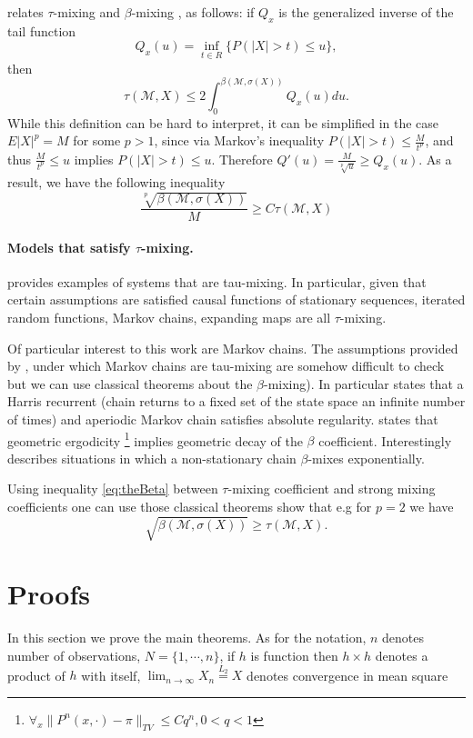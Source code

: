 \documentclass{article} %
\begin{document}
 
\cite[Equation  7.6]{dedecker2005new} relates $\tau$-mixing and $\beta$-mixing , as follows: if $Q_x$ is the generalized inverse of the tail function
\[
 Q_x(u) = \inf_{t \in R} \{  P(|X| > t) \leq u\},  
\]
then
\[
 \tau(\mathcal{M},X) \leq 2 \int_{0}^{\beta(\mathcal{M},\sigma(X))}  Q_x(u) du.
\]
While this definition can be hard to interpret, it can be simplified in the case $E|X|^p=M$  for some $p>1$, since via Markov's inequality $P(|X|>t) \leq \frac{M}{t^p}$, and thus $\frac{M}{t^p} \leq u $ implies $P(|X|>t) \leq u$. Therefore $Q'(u) = \frac{M}{\sqrt[p]{u}} \geq Q_x(u)$. As a result, we have the following inequality 
\begin{equation}
\label{eq:theBeta}
 \frac{ \sqrt[p]{ \beta(\mathcal{M},\sigma(X))} }{ M }  \geq C  \tau(\mathcal{M},X) 
\end{equation}

\paragraph{Models that satisfy $\tau$-mixing.}
\cite{dedecker2005new} provides  examples of systems that are tau-mixing. In particular, given that certain assumptions are satisfied  causal functions of stationary sequences, iterated random functions, Markov chains, expanding maps are all $\tau$-mixing. 

Of particular interest to this work are Markov chains. The assumptions provided by \cite{dedecker2005new}, under which Markov chains are tau-mixing are somehow difficult to check but we can use classical theorems about the $\beta$-mixing).  In particular \cite[Corollary 3.6]{bradley_basic_2005}  states that a Harris recurrent (chain returns to a fixed set of the state space an infinite number of times) and aperiodic Markov chain satisfies absolute regularity.  \cite[Theorem 3.7]{bradley_basic_2005} states that geometric ergodicity \footnote{ $\forall_{x} \|P^n(x,\cdot)  -\pi \|_{TV} \leq C q^n, 0<q<1$} implies geometric decay of the $\beta$ coefficient. Interestingly \cite[Theorem 3.3]{bradley_basic_2005} describes situations in which a non-stationary chain $\beta$-mixes exponentially. 

Using inequality \ref{eq:theBeta} between $\tau$-mixing coefficient and strong mixing coefficients one can use  those classical theorems show that e.g for  $p=2$ we have 
\[
 \sqrt{ \beta(\mathcal{M},\sigma(X))}  \geq \tau(\mathcal{M},X).
\]




\section{Proofs}
\label{sec:Wildproofs}
In this section we prove the main theorems. As for the notation,  $n$ denotes number of observations, $N = \{1,\cdots, n\}$, if $h$ is  function then $h \times h$ denotes  a  product of $h$ with itself, $\lim_{n \to \infty} X_n \overset{L_2}{=} X$ denotes convergence in mean square 
\end{document}
